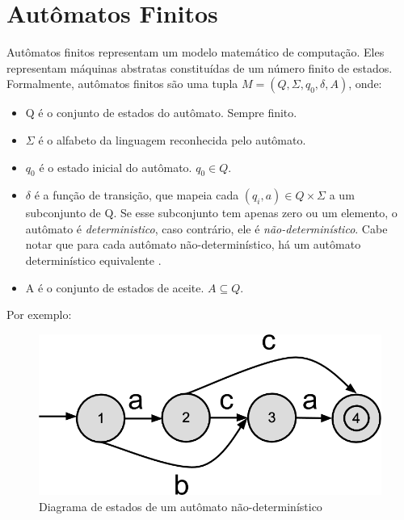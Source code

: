 \documentclass[a4paper,12pt,oneside,onecolumn]{uerj}
\begin{document}
\section{Autômatos Finitos}

Autômatos finitos representam um modelo matemático de computação. Eles representam máquinas abstratas constituídas de um número finito de estados. Formalmente, autômatos finitos são uma tupla $M = (Q, \Sigma, q_0, \delta, A)$, onde:

\begin{itemize}
    \item Q é o conjunto de estados do autômato. Sempre finito.
    \item $\Sigma$ é o alfabeto da linguagem reconhecida pelo autômato.
    \item $q_0$ é o estado inicial do autômato. $q_0 \in Q$.
    \item $\delta$ é a função de transição, que mapeia cada $(q_i, a) \in Q \times \Sigma$ a um subconjunto de Q. Se esse subconjunto tem apenas zero ou um elemento, o autômato é \emph{deterministico}, caso contrário, ele é \emph{não-determinístico}. Cabe notar que para cada autômato não-determinístico, há um autômato determinístico equivalente \cite{bib:Rabin59}.
    \item A é o conjunto de estados de aceite. $A \subseteq Q$.
\end{itemize}

Por exemplo:

\begin{figure}[!htbp]
  \centering
  \includegraphics[scale=0.3]{figures/exemplo_automato_numerado.png}
  \caption{Diagrama de estados de um autômato não-determinístico}
  \label{fig:exemplo_automato_numerado}
\end{figure}
\end{document}
